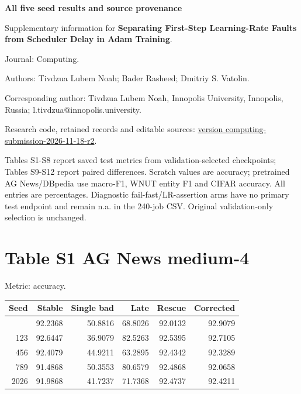 \documentclass[11pt,a4paper]{article}
\begin{document}
\begin{center}{\Large\bfseries All five seed results and source provenance}\end{center}
Supplementary information for \textbf{Separating First-Step Learning-Rate Faults from Scheduler Delay in Adam Training}.

Journal: Computing.

Authors: Tivdzua Lubem Noah; Bader Rasheed; Dmitriy S. Vatolin.

Corresponding author: Tivdzua Lubem Noah, Innopolis University, Innopolis, Russia; l.tivdzua@innopolis.university.

Research code, retained records and editable sources: \href{https://github.com/tivdzualubem/warmup-update-budget-acml2026/tree/computing-submission-2026-11-18-r2}{version computing-submission-2026-11-18-r2}.

Tables S1-S8 report saved test metrics from validation-selected checkpoints; Tables S9-S12 report paired differences. Scratch values are accuracy; pretrained AG News/DBpedia use macro-F1, WNUT entity F1 and CIFAR accuracy. All entries are percentages. Diagnostic fail-fast/LR-assertion arms have no primary test endpoint and remain n.a. in the 240-job CSV. Original validation-only selection is unchanged.


\section{Table S1 AG News medium-4}\label{table-s1-ag-news-medium-4}

Metric: accuracy.

\begin{longtable}[]{@{}rrrrrr@{}}
\toprule\noalign{}
Seed & Stable & Single bad & Late & Rescue & Corrected \\
\midrule\noalign{}
\endhead
\bottomrule\noalign{}
\endlastfoot
42 & 92.2368 & 50.8816 & 68.8026 & 92.0132 & 92.9079 \\
123 & 92.6447 & 36.9079 & 82.5263 & 92.5395 & 92.7105 \\
456 & 92.4079 & 44.9211 & 63.2895 & 92.4342 & 92.3289 \\
789 & 91.4868 & 50.3553 & 80.6579 & 92.4868 & 92.0658 \\
2026 & 91.9868 & 41.7237 & 71.7368 & 92.4737 & 92.4211 \\
\end{longtable}
\end{document}
